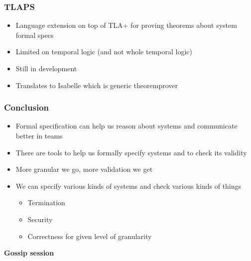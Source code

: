 \documentclass{beamer}
\begin{document}
\begin{frame}
    \frametitle{TLAPS}
    \begin{itemize}
        \item Language extension on top of TLA+ for proving theorems about system formal specs 
        \item Limited on temporal logic (and not whole temporal logic)
        \item Still in development 
        \item Translates to Isabelle which is generic theoremprover 
    \end{itemize}

    

\end{frame}


\begin{frame}
    \frametitle{Conclusion}
    \begin{itemize}
        \item Formal specification can help us reason about systems and communicate better in teams
        \item There are tools to help us formally specify systems and to check its validity 
        \item More granular we go, more validation we get
        \item We can specify various kinds of systems and check various kinds of things
        \begin{itemize}
            \item Termination
            \item Security
            \item Correctness for given level of granularity
        \end{itemize}
    \end{itemize}
\end{frame}

\begin{frame}
    \begin{center}
        \LARGE{\textbf{Gossip session}}
    \end{center}

\end{frame}
\end{document}
